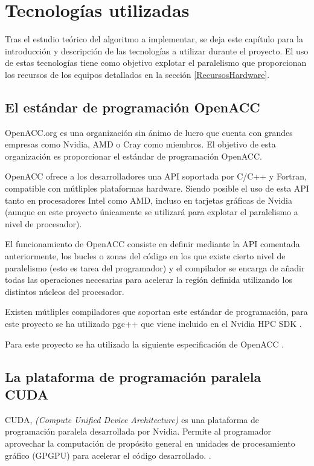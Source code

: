 \chapter{Tecnologías utilizadas}
\label{Tecnologias}
Tras el estudio teórico del algoritmo a implementar, se deja este capítulo para la introducción y descripción de las tecnologías a utilizar durante el proyecto. El uso de estas tecnologías tiene como objetivo explotar el paralelismo que proporcionan los recursos de los equipos detallados en la sección \ref{RecursosHardware}.

\section{El estándar de programación OpenACC}
\label{OpenACC}
OpenACC.org \cite{unknown-author-no-dateB} es una organización sin ánimo de lucro que cuenta con grandes empresas como Nvidia, AMD o Cray como miembros. El objetivo de esta organización es proporcionar el estándar de programación OpenACC.

OpenACC ofrece a los desarrolladores una API soportada por C/C++ y Fortran, compatible con mútliples plataformas hardware. Siendo posible el uso de esta API tanto en procesadores Intel como AMD, incluso en tarjetas gráficas de Nvidia (aunque en este proyecto únicamente se utilizará para explotar el paralelismo a nivel de procesador).

El funcionamiento de OpenACC consiste en definir mediante la API comentada anteriormente, los bucles o zonas del código en los que existe cierto nivel de paralelismo (esto es tarea del programador) y el compilador se encarga de añadir todas las operaciones necesarias para acelerar la región definida utilizando los distintos núcleos del procesador.

Existen mútliples compiladores que soportan este estándar de programación, para este proyecto se ha utilizado pgc++ que viene incluido en el Nvidia HPC SDK \cite{unknown-author-2021D}.

Para este proyecto se ha utilizado la siguiente especificación de OpenACC \cite{unknown-author-2019}.


\section{La plataforma de programación paralela CUDA}

CUDA, \textit{(Compute Unified Device Architecture)} es una plataforma de programación paralela desarrollada por Nvidia. Permite al programador aprovechar la computación de propósito general en unidades de procesamiento gráfico (GPGPU) para acelerar el código desarrollado. \cite{unknown-author-2021E}.

